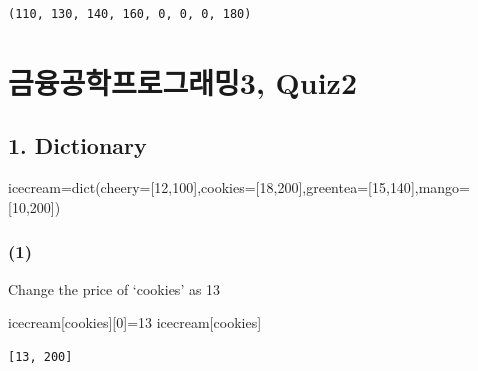 \documentclass[
  letterpaper,
  DIV=11,
  numbers=noendperiod]{scrreprt}
\newenvironment{Shaded}{\begin{snugshade}}{\end{snugshade}}
\newcommand{\BuiltInTok}[1]{\textcolor[rgb]{0.00,0.23,0.31}{#1}}
\newcommand{\DecValTok}[1]{\textcolor[rgb]{0.68,0.00,0.00}{#1}}
\newcommand{\NormalTok}[1]{\textcolor[rgb]{0.00,0.23,0.31}{#1}}
\newcommand{\OperatorTok}[1]{\textcolor[rgb]{0.37,0.37,0.37}{#1}}
\newcommand{\StringTok}[1]{\textcolor[rgb]{0.13,0.47,0.30}{#1}}
\begin{document}
\begin{verbatim}
(110, 130, 140, 160, 0, 0, 0, 180)
\end{verbatim}

\chapter*{금융공학프로그래밍3,
Quiz2}\label{uxae08uxc735uxacf5uxd559uxd504uxb85cuxadf8uxb798uxbc0d3-quiz2}


\section*{1. Dictionary}\label{dictionary}


\begin{Shaded}
\begin{Highlighting}[]
\NormalTok{icecream}\OperatorTok{=}\BuiltInTok{dict}\NormalTok{(cheery}\OperatorTok{=}\NormalTok{[}\DecValTok{12}\NormalTok{,}\DecValTok{100}\NormalTok{],cookies}\OperatorTok{=}\NormalTok{[}\DecValTok{18}\NormalTok{,}\DecValTok{200}\NormalTok{],greentea}\OperatorTok{=}\NormalTok{[}\DecValTok{15}\NormalTok{,}\DecValTok{140}\NormalTok{],mango}\OperatorTok{=}\NormalTok{[}\DecValTok{10}\NormalTok{,}\DecValTok{200}\NormalTok{])}
\end{Highlighting}
\end{Shaded}

\subsection*{(1)}\label{section}

Change the price of `cookies' as 13

\begin{Shaded}
\begin{Highlighting}[]
\NormalTok{icecream[}\StringTok{\textquotesingle{}cookies\textquotesingle{}}\NormalTok{][}\DecValTok{0}\NormalTok{]}\OperatorTok{=}\DecValTok{13}
\NormalTok{icecream[}\StringTok{\textquotesingle{}cookies\textquotesingle{}}\NormalTok{]}
\end{Highlighting}
\end{Shaded}

\begin{verbatim}
[13, 200]
\end{verbatim}
\end{document}
